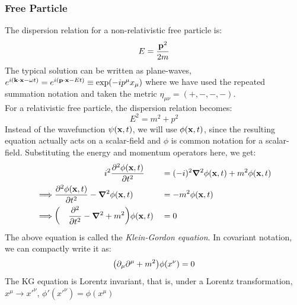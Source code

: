 \subsubsection{Free Particle}
The dispersion relation for a non-relativistic free particle is:
$$E = \frac{\vb{p}^2}{2m}$$
The typical solution can be written as plane-waves, $e^{i(\vb{k}\cdot\vb{x}-\omega t)} = e^{i(\vb{p}\cdot\vb{x} - Et)} \equiv \exp(-ip^\mu x_\mu)$ where we have used the repeated summation notation and taken the metric $\eta_{\mu\nu} = (+,-,-,-)$.\\[0.2cm]
For a relativistic free particle, the dispersion relation becomes:
$$E^2 = m^2 + p^2$$
Instead of the wavefunction $\psi(\vb{x},t)$, we will use $\phi(\vb{x},t)$, since the resulting equation actually acts on a scalar-field and $\phi$ is common notation for a scalar-field. Substituting the energy and momentum operators here, we get:
\begin{alignat*}{3}
    &\qquad\qquad \qquad i^2 \pdv[2]{\phi(\vb{x},t)}{t} &&= (-i)^2 \grad^2\phi(\vb{x},t) + m^2\phi(\vb{x},t)\\
  \implies  &  \pdv[2]{\phi(\vb{x},t)}{t} - \grad^2\phi(\vb{x},t) &&= -m^2 \phi(\vb{x},t)\\
  \implies & \qty(\quad  \pdv[2]{t} -\grad^2 +m^2)\phi(\vb{x},t) &&= 0
\end{alignat*}
The above equation is called the \textit{Klein-Gordon equation}. In covariant notation, we can compactly write it as:
$$\qty(\partial_\mu \partial^\mu +m^2)\phi(x^\nu) = 0 $$
The KG equation is Lorentz invariant, that is, under a Lorentz transformation, $x^\mu \rightarrow x'^\nu$, $\phi'(x'^\nu) = \phi(x^\mu)$
